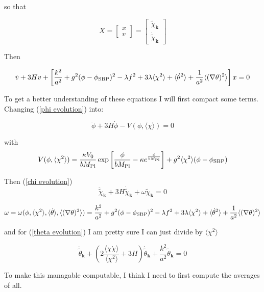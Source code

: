 so that

\begin{equation*}
    X = 
    \begin{bmatrix}
        x \\
        v
    \end{bmatrix}
    =
    \begin{bmatrix}
        \tilde{\chi}_\mathbf{k} \\
        \dot{\tilde{\chi}}_{\mathbf{k}}
    \end{bmatrix}
\end{equation*}

Then 

\begin{equation*}
\dot{v} + 3H v
+ \left[
\frac{k^2}{a^2}
+ g^2 (\phi - \phi_{\rm SBP})^2
- \lambda f^2
+ 3 \lambda \langle \chi^2 \rangle + \langle \dot{\theta}^2 \rangle
+ \frac{1}{a^2} \langle (\nabla \theta)^2 \rangle
\right]
x = 0
\end{equation*}

To get a better understanding of these equations I will first compact some terms. Changing (\ref{phi evolution}) into:

\begin{equation*}
\ddot{\phi} + 3H \dot{\phi}
 - V(\phi, \langle \chi \rangle) = 0
\end{equation*}

with
\begin{equation*}
V(\phi, \langle \chi^2 \rangle) = \frac{\kappa V_0}{b M_{\rm Pl}}
 \exp \left[\frac{\phi}{b M_{\rm Pl}} - \kappa e^{\frac{\phi}{b M_{\rm Pl}}}\right]
 + g^2 \langle \chi^2 \rangle (\phi - \phi_{\rm SBP})
\end{equation*}

Then (\ref{chi evolution})
\begin{equation*}
    \ddot{\tilde{\chi}}_{\mathbf{k}} + 3H \dot{\tilde{\chi}}_{\mathbf{k}} + 
    \omega \tilde{\chi}_{\mathbf{k}} = 0
\end{equation*}

\begin{equation*}
    \omega = \omega(\phi, \langle \chi^2 \rangle, \langle \dot{\theta} \rangle, \langle (\nabla \theta)^2 \rangle) = 
    \frac{k^2}{a^2}
    + g^2 (\phi - \phi_{\rm SBP})^2
    - \lambda f^2
    + 3 \lambda \langle \chi^2 \rangle + \langle \dot{\theta}^2 \rangle
    + \frac{1}{a^2} \langle (\nabla \theta)^2 \rangle
\end{equation*}

and for (\ref{theta evolution}) I am pretty sure I can just divide by $\langle \chi^2 \rangle$

\begin{equation*}
    \ddot{\tilde{\theta}}_{\mathbf{k}}
+ \left( 2 \frac{\langle \chi \dot{\chi} \rangle}{\langle \chi^2 \rangle} + 3H \right) \dot{\tilde{\theta}}_{\mathbf{k}}
+ \frac{k^2}{a^2} \tilde{\theta}_{\mathbf{k}} = 0
\end{equation*}

To make this managable computable, I think I need to first compute the averages of all.


